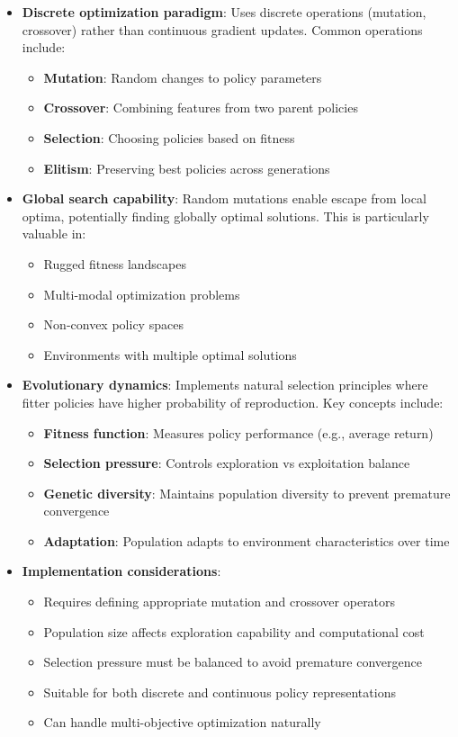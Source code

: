 \documentclass[12pt]{article}
\begin{document}
{{{\begin{itemize}
    \item \textbf{Discrete optimization paradigm}: Uses discrete operations (mutation, crossover) rather than continuous gradient updates. Common operations include:
    \begin{itemize}
        \item \textbf{Mutation}: Random changes to policy parameters
        \item \textbf{Crossover}: Combining features from two parent policies
        \item \textbf{Selection}: Choosing policies based on fitness
        \item \textbf{Elitism}: Preserving best policies across generations
    \end{itemize}
    
    \item \textbf{Global search capability}: Random mutations enable escape from local optima, potentially finding globally optimal solutions. This is particularly valuable in:
    \begin{itemize}
        \item Rugged fitness landscapes
        \item Multi-modal optimization problems
        \item Non-convex policy spaces
        \item Environments with multiple optimal solutions
    \end{itemize}
    
    \item \textbf{Evolutionary dynamics}: Implements natural selection principles where fitter policies have higher probability of reproduction. Key concepts include:
    \begin{itemize}
        \item \textbf{Fitness function}: Measures policy performance (e.g., average return)
        \item \textbf{Selection pressure}: Controls exploration vs exploitation balance
        \item \textbf{Genetic diversity}: Maintains population diversity to prevent premature convergence
        \item \textbf{Adaptation}: Population adapts to environment characteristics over time
    \end{itemize}
    
    \item \textbf{Implementation considerations}:
    \begin{itemize}
        \item Requires defining appropriate mutation and crossover operators
        \item Population size affects exploration capability and computational cost
        \item Selection pressure must be balanced to avoid premature convergence
        \item Suitable for both discrete and continuous policy representations
        \item Can handle multi-objective optimization naturally
    \end{itemize}
\end{itemize}

}}}
\end{document}

